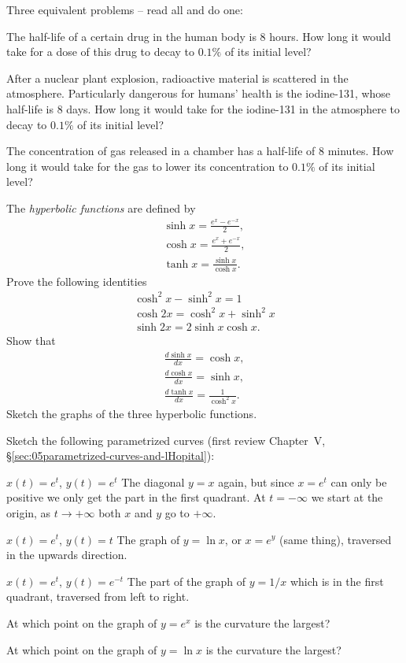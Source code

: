 \begin{multicols}{2}
\problem Three equivalent problems -- read all and do one:

\subprob The half-life of a certain drug in the human body is $8$ hours. How
long it would take for a dose of this drug to decay to $0.1\%$ of its initial
level?

\subprob After a nuclear plant explosion, radioactive material is scattered in
the atmosphere. Particularly dangerous for humans' health is the iodine-131,
whose half-life is $8$ days. How long it would take for the iodine-131 in the
atmosphere to decay to $0.1\%$ of its initial level?

\subprob The concentration of gas released in a chamber has a half-life of $8$
minutes. How long it would take for the gas to lower its concentration to
$0.1\%$ of its initial level?

\problem The \textit{hyperbolic functions} are defined by
\begin{gather*}
  \sinh x = \frac{e^x-e^{-x}}2,\\
  \cosh x = \frac{e^x+e^{-x}}2,\\
  \tanh x = \frac{\sinh x}{\cosh x}.
\end{gather*}
\subprob Prove the following identities
\begin{gather*}
  \cosh^2 x -\sinh^2 x = 1\\
  \cosh 2x = \cosh^2x + \sinh ^2 x \\
  \sinh 2x = 2\sinh x \cosh x.
\end{gather*}
\subprob Show that
\begin{gather*}
  \frac{d\sinh x}{dx} = \cosh x, \\
  \frac{d\cosh x}{dx} = \sinh x, \\
  \frac{d\tanh x}{dx} = \frac1{\cosh^2 x}.
\end{gather*}
\subprob Sketch the graphs of the three hyperbolic functions.


\problem Sketch the following parametrized curves
(first review Chapter~V, \S\ref{sec:05parametrized-curves-and-lHopital}):

\subprob \(x(t) =  e^t \), \(y(t) = e^t  \)
\answer
The diagonal $y=x$ again, but since $x=e^t$ can only be positive we only get the
part in the first quadrant.  At $t=-\infty$ we start at the origin, as
$t\to+\infty$ both $x$ and $y$ go to $+\infty$.
\endanswer

\subprob \(x(t) =  e^t \), \(y(t) = t  \)
\answer
The graph of $y=\ln x$, or $x=e^y$ (same thing), traversed in the upwards
direction.
\endanswer

\subprob \(x(t) =  e^t \), \(y(t) = e^{-t}  \)
\answer
The part of the graph of $y=1/x$ which is in the first quadrant, traversed from
left to right.
\endanswer

\problem \subprob At which point on the graph of $y=e^x$ is the
curvature the largest?

 \subprob At which point on the graph of $y=\ln x$ is the
curvature the largest?




\end{multicols}
\noproblemfont


